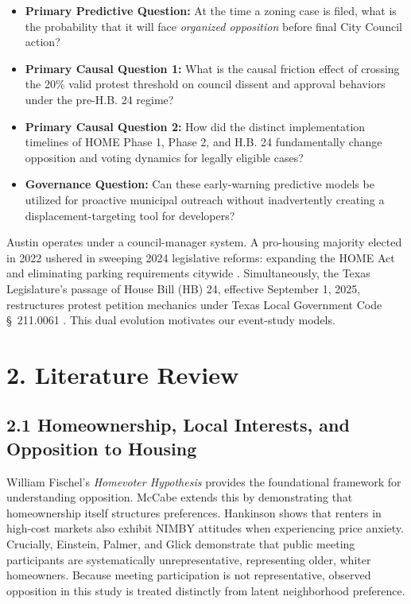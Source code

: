 \begin{itemize}
 \item \textbf{Primary Predictive Question:} At the time a zoning case is filed, what is the probability that it will face \textit{organized opposition} before final City Council action?
 \item \textbf{Primary Causal Question 1:} What is the causal friction effect of crossing the 20\% valid protest threshold on council dissent and approval behaviors under the pre-H.B. 24 regime?
 \item \textbf{Primary Causal Question 2:} How did the distinct implementation timelines of HOME Phase 1, Phase 2, and H.B. 24 fundamentally change opposition and voting dynamics for legally eligible cases?
 \item \textbf{Governance Question:} Can these early-warning predictive models be utilized for proactive municipal outreach without inadvertently creating a displacement-targeting tool for developers?
\end{itemize}

Austin operates under a council-manager system. A pro-housing majority elected in 2022 ushered in sweeping 2024 legislative reforms: expanding the HOME Act and eliminating parking requirements citywide \cite{axios2023parking}. Simultaneously, the Texas Legislature's passage of House Bill (HB) 24, effective September 1, 2025, restructures protest petition mechanics under Texas Local Government Code \S~211.0061 \cite{hb24_2025}. This dual evolution motivates our event-study models.

\section*{2. Literature Review}

\subsection*{2.1 Homeownership, Local Interests, and Opposition to Housing}
William Fischel's \textit{Homevoter Hypothesis} \cite{fischel2001homevoter} provides the foundational framework for understanding opposition. McCabe \cite{mccabe2016} extends this by demonstrating that homeownership itself structures preferences. Hankinson \cite{hankinson2018} shows that renters in high-cost markets also exhibit NIMBY attitudes when experiencing price anxiety. Crucially, Einstein, Palmer, and Glick \cite{einstein2019} demonstrate that public meeting participants are systematically unrepresentative, representing older, whiter homeowners. Because meeting participation is not representative, observed opposition in this study is treated distinctly from latent neighborhood preference.

